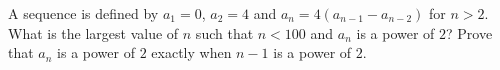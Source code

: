 A sequence is defined by $a_1=0$, $a_2=4$ and $a_n=4(a_{n-1}-a_{n-2})$ for $n>2$. What is the largest value of $n$ such that $n<100$ and $a_n$ is a power of $2$? Prove that $a_n$ is a power of $2$ exactly when $n-1$ is a power of $2$.
